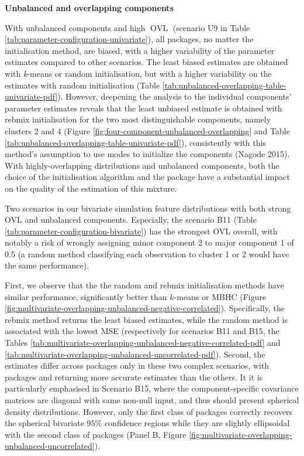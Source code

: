 \textbf{Unbalanced and overlapping components}

With unbalanced components and high \(\operatorname{OVL}\) (scenario U9 in Table
\ref{tab:parameter-configuration-univariate}), all packages, no
matter the initialisation method, are biased, with a higher variability
of the parameter estimates compared to other scenarios. The least biased
estimates are obtained with \emph{k}-means or random initialisation, but with
a higher variability on the estimates with random initialisation (Table
\ref{tab:unbalanced-overlapping-table-univariate-pdf}).
However, deepening the analysis to the individual components' parameter estimates
reveals that the least unbiased estimate is obtained with rebmix initialisation
for the two most distinguishable components, namely clusters 2 and 4 (Figure \ref{fig:four-component-unbalanced-overlapping} and
Table
\ref{tab:unbalanced-overlapping-table-univariate-pdf}), consistently with this method's assumption to use modes to initialize the components (Nagode 2015). With highly-overlapping distributions and unbalanced components, both the choice of the initialisation algorithm and the package have a
substantial impact on the quality of the estimation of this mixture.

Two scenarios in our bivariate simulation feature distributions with both strong OVL and unbalanced components. Especially, the scenario B11 (Table \ref{tab:parameter-configuration-bivariate}) has the strongest OVL overall, with notably a risk of wrongly assigning minor component 2 to major component 1 of 0.5 (a random method classifying each observation to cluster 1 or 2 would have the same performance).

First, we observe that the the random and rebmix initialisation methods have similar performance, significantly better than \(k\)-means or MBHC (Figure \ref{fig:multivariate-overlapping-unbalanced-negative-correlated}). Specifically, the rebmix method returns the least biased estimates, while the random method is associated with the lowest MSE (respectively for scenarios B11 and B15, the Tables \ref{tab:multivariate-overlapping-unbalanced-negative-correlated-pdf}
and \ref{tab:multivariate-overlapping-unbalanced-uncorrelated-pdf}). Second, the estimates differ across packages only in these two complex scenarios, with packages  and  returning more accurate estimates than the others.
It it is particularly emphasised in Scenario B15, where the component-specific covariance matrices are diagonal with same non-null input, and thus should present spherical density distributions. However, only the first class of packages correctly recovers the spherical bivariate \(95\%\) confidence regions while they are slightly ellipsoidal with the second class of packages (Panel B, Figure \ref{fig:multivariate-overlapping-unbalanced-uncorrelated}).

